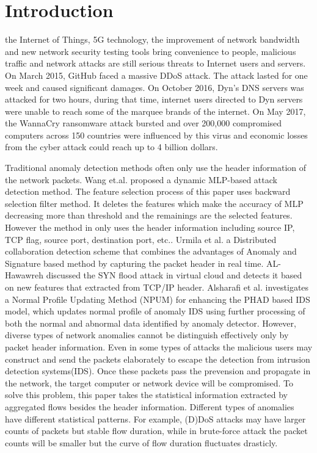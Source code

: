 \documentclass{ieeeaccess}
\theoremstyle{definition}
\begin{document}
\section{Introduction}
\label{sec:introduction}
 the Internet of Things, 5G technology, the improvement of network bandwidth and new network security testing tools bring convenience to people, malicious traffic and network attacks are still serious threats to Internet users and servers. 
On March 2015, GitHub faced a massive DDoS attack. The attack lasted for one week and caused significant damages\cite{github-2015}. On October 2016, Dyn's DNS servers was attacked for two hours, during that time, internet users directed to Dyn servers were unable to reach some of the marquee brands of the internet\cite{dyn-2016}. On May 2017, the WannaCry ransomware attack bursted and over 200,000 compromised computers across 150 countries were influenced by this virus and economic losses from the cyber attack could reach up to 4 billion dollars\cite{wannacry-2017}.

Traditional anomaly detection methods often only use the header information of the network packets. Wang et.al. \cite{Wang2020CS} proposed a dynamic MLP-based attack detection method. The feature selection process of this paper uses backward selection filter method. It deletes the features which make the accuracy of MLP decreasing more than threshold and the remainings are the selected features. However the method in \cite{Wang2020CS} only uses the header information including source IP, TCP flag, source port, destination port, etc.. Urmila et al.\cite{Urmila2017} a Distributed collaboration detection scheme that combines the advantages of Anomaly and Signature based method by capturing the packet header in real time. AL-Hawawreh\cite{MunaSulieman2017} discussed the SYN flood attack in virtual cloud and detects it based on new features that extracted from TCP/IP header. Alsharafi et al.\cite{Alsharafi2020} investigates a Normal Profile Updating Method (NPUM) for enhancing the PHAD based IDS model, which updates normal profile of anomaly IDS using further processing of both the normal and abnormal data identified by anomaly detector.
However, diverse types of network anomalies cannot be distinguish effectively only by packet header information. Even in some types of attacks the malicious users may construct and send the packets elaborately to escape the detection from intrusion detection systems(IDS). Once these packets pass the prevension and propagate in the network, the target computer or network device will be compromised.
To solve this problem, this paper takes the statistical information extracted by aggregated flows besides the header information. Different types of anomalies have different statistical patterns. For example, (D)DoS attacks may have larger counts of packets but stable flow duration, while in brute-force attack the packet counts will be smaller but the curve of flow duration fluctuates drasticly. 
\end{document}
